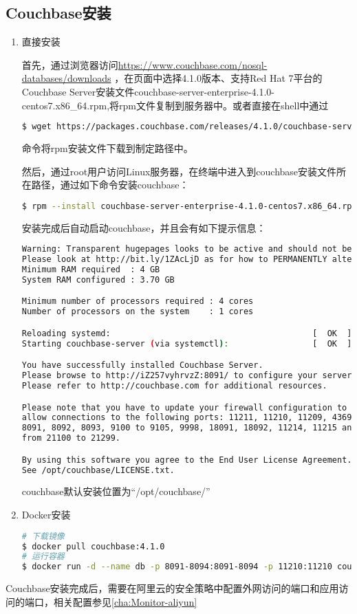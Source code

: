 \subsection{Couchbase安装}
\begin{enumerate}
\item 直接安装\cite{brown2012getting}

首先，通过浏览器访问\url{https://www.couchbase.com/nosql-databases/downloads}
，在页面中选择4.1.0版本、支持Red Hat 7平台的Couchbase Server安装文件couchbase-server-enterprise-4.1.0-centos7.x86\_64.rpm,将rpm文件复制到服务器中。或者直接在shell中通过
\begin{lstlisting}[language=bash,numbers=none]
$ wget https://packages.couchbase.com/releases/4.1.0/couchbase-server-enterprise-4.1.0-centos7.x86_64.rpm
\end{lstlisting}
命令将rpm安装文件下载到制定路径中。

然后，通过root用户访问Linux服务器，在终端中进入到couchbase安装文件所在路径，通过如下命令安装couchbase：
\begin{lstlisting}[language=bash,numbers=none]
$ rpm --install couchbase-server-enterprise-4.1.0-centos7.x86_64.rpm
\end{lstlisting}
安装完成后自动启动couchbase，并且会有如下提示信息：
\begin{lstlisting}[language=bash,numbers=none]
Warning: Transparent hugepages looks to be active and should not be.
Please look at http://bit.ly/1ZAcLjD as for how to PERMANENTLY alter this setting.
Minimum RAM required  : 4 GB
System RAM configured : 3.70 GB

Minimum number of processors required : 4 cores
Number of processors on the system    : 1 cores

Reloading systemd:                                         [  OK  ]
Starting couchbase-server (via systemctl):                 [  OK  ]

You have successfully installed Couchbase Server.
Please browse to http://iZ257vyhrvzZ:8091/ to configure your server.
Please refer to http://couchbase.com for additional resources.

Please note that you have to update your firewall configuration to
allow connections to the following ports: 11211, 11210, 11209, 4369,
8091, 8092, 8093, 9100 to 9105, 9998, 18091, 18092, 11214, 11215 and
from 21100 to 21299.

By using this software you agree to the End User License Agreement.
See /opt/couchbase/LICENSE.txt.
\end{lstlisting}
couchbase默认安装位置为“/opt/couchbase/”

\item Docker安装\cite{merkel2014docker}

\begin{lstlisting}[language=bash,numbers=none]
# 下载镜像
$ docker pull couchbase:4.1.0
# 运行容器
$ docker run -d --name db -p 8091-8094:8091-8094 -p 11210:11210 couchbase
\end{lstlisting}

\end{enumerate}
Couchbase安装完成后，需要在阿里云的安全策略中配置外网访问的端口和应用访问的端口，相关配置参见\ref{cha:Monitor-aliyun}

